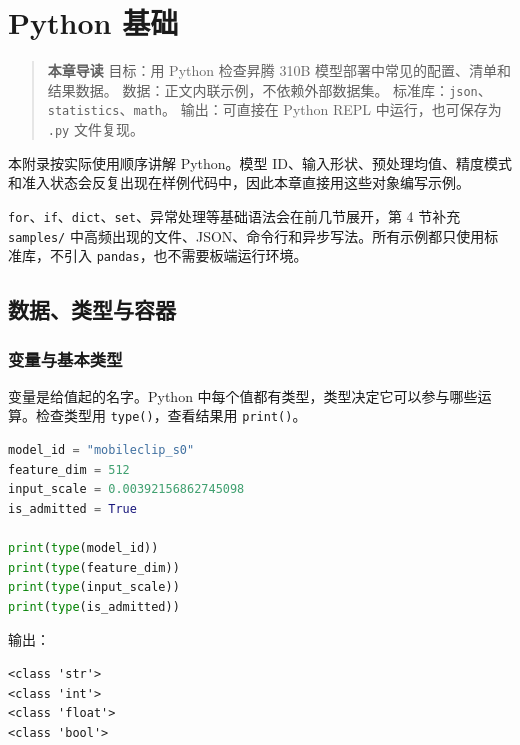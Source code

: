 \chapter{Python 基础}\label{ux9644ux5f55-3python-ux57faux7840}

\begin{quote}
\textbf{本章导读} 目标：用 Python 检查昇腾 310B
模型部署中常见的配置、清单和结果数据。
数据：正文内联示例，不依赖外部数据集。
标准库：\passthrough{\lstinline!json!}、\passthrough{\lstinline!statistics!}、\passthrough{\lstinline!math!}。
输出：可直接在 Python REPL 中运行，也可保存为
\passthrough{\lstinline!.py!} 文件复现。
\end{quote}

本附录按实际使用顺序讲解 Python。模型
ID、输入形状、预处理均值、精度模式和准入状态会反复出现在样例代码中，因此本章直接用这些对象编写示例。

\passthrough{\lstinline!for!}、\passthrough{\lstinline!if!}、\passthrough{\lstinline!dict!}、\passthrough{\lstinline!set!}、异常处理等基础语法会在前几节展开，第
4 节补充 \passthrough{\lstinline!samples/!}
中高频出现的文件、JSON、命令行和异步写法。所有示例都只使用标准库，不引入
\passthrough{\lstinline!pandas!}，也不需要板端运行环境。

\section{数据、类型与容器}\label{ux6570ux636eux7c7bux578bux4e0eux5bb9ux5668}

\subsection{变量与基本类型}\label{ux53d8ux91cfux4e0eux57faux672cux7c7bux578b}

变量是给值起的名字。Python
中每个值都有类型，类型决定它可以参与哪些运算。检查类型用
\passthrough{\lstinline!type()!}，查看结果用
\passthrough{\lstinline!print()!}。

\begin{lstlisting}[language=Python]
model_id = "mobileclip_s0"
feature_dim = 512
input_scale = 0.00392156862745098
is_admitted = True

print(type(model_id))
print(type(feature_dim))
print(type(input_scale))
print(type(is_admitted))
\end{lstlisting}

输出：

\begin{lstlisting}
<class 'str'>
<class 'int'>
<class 'float'>
<class 'bool'>
\end{lstlisting}


